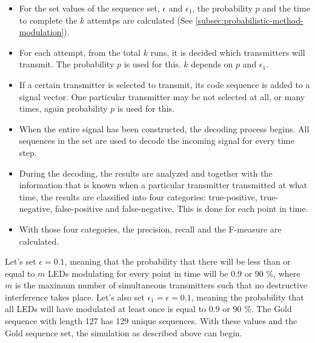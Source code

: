 \begin{itemize}

	\item For the set values of the sequence set, $\epsilon$ and $\epsilon_1$, the probability $p$ and the time to complete the $k$ attemtps are calculated (See \autoref{subsec:probabilistic-method-modulation}).

	\item For each attempt, from the total $k$ runs, it is decided which transmitters will transmit. The probability $p$ is used for this. $k$ depends on $p$ and $\epsilon_1$.

	\item If a certain transmitter is selected to transmit, its code sequence is added to a signal vector. One particular transmitter may be not selected at all, or many times, again probability $p$ is used for this.

	\item When the entire signal has been constructed, the decoding process begins. All sequences in the set are used to decode the incoming signal for every time step.

	\item During the decoding, the results are analyzed and together with the information that is known when a particular transmitter transmitted at what time, the results are classified into four categories: true-positive, true-negative, false-positive and false-negative. This is done for each point in time.

	\item With those four categories, the precision, recall and the F-measure are calculated.



\end{itemize}




Let's set $\epsilon = 0.1$, meaning that the probability that there will be less than or equal to $m$ LEDs modulating for every point in time will be 0.9 or 90 \%, where $m$ is the maximum number of simultaneous transmitters such that no destructive interference takes place.
Let's also set $\epsilon_1 = \epsilon = 0.1$, meaning the probability that all LEDs will have modulated at least once is equal to 0.9 or 90 \%.
The Gold sequence with length 127 has 129 unique sequences.
With these values and the Gold sequence set, the simulation as described above can begin. 



